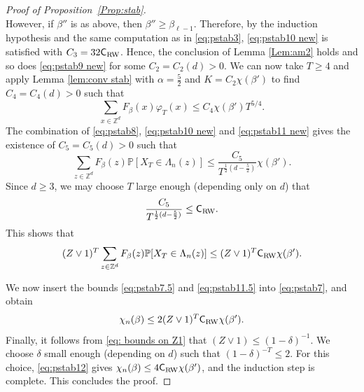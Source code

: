 \documentclass[11pt,a4paper]{article}
\numberwithin{equation}{section}
\theoremstyle{plain}
\theoremstyle{definition}
\newcommand\1{\mathds{1}}
\newcommand\Crw{\mathsf{C}_{\textup{RW}}}
\begin{document}
\begin{proof}[Proof of Proposition~\textup{\ref{Prop:stab}}]
\begin{equation}
\end{equation}
However, if $\beta''$ is as above, then $\beta''\geq \beta_{\ell-1}$. Therefore, by the induction hypothesis and the same computation as in \eqref{eq:pstab3}, \eqref{eq:pstab10 new} is satisfied with $C_3=32\Crw$. Hence, the conclusion of Lemma \ref{Lem:am2} holds and so does \eqref{eq:pstab9 new} for some $C_2=C_2(d)>0$. We can now take $T \geq 4$ and apply Lemma \ref{lem:conv stab} with $\alpha=\frac 52$ and $K=C_2\chi(\beta')$ to find $C_4=C_4(d)>0$ such that
\begin{equation}\label{eq:pstab11 new}
	\sum_{x\in \mathbb Z^d}F_\beta(x)\varphi_T(x)\leq C_4\chi(\beta')T^{5/4}.
\end{equation}
The combination of \eqref{eq:pstab8}, \eqref{eq:pstab10 new} and \eqref{eq:pstab11 new} gives the existence of $C_5=C_5(d)>0$ such that
\begin{equation}
\label{eq:pstab11.1}
	\sum_{z\in \mathbb Z^d}F_\beta(z)\mathbb P[X_T\in \Lambda_n(z)]
    \leq \frac{C_5}{T^{\frac 12 (d-\frac 52)}}\chi(\beta').
\end{equation}
Since $d \ge 3$,
we may choose $T$ large enough (depending only on $d$) that
\begin{equation}
	\frac{C_5}{T^{\frac 12 (d-\frac 52)}} \leq \Crw.
\end{equation}
This shows that
\begin{equation}
\label{eq:pstab11.5}
	(Z\vee 1)^T \sum_{z\in \mathbb Z^d}F_\beta(z)\mathbb P[X_T\in \Lambda_n(z)]
    \leq
    (Z\vee 1)^T \Crw\chi(\beta').
\end{equation}

We now insert the bounds \eqref{eq:pstab7.5} and \eqref{eq:pstab11.5}
into \eqref{eq:pstab7}, and obtain
\begin{equation}\label{eq:pstab12}
	\chi_n(\beta)\leq 2(Z\vee 1)^T\Crw\chi(\beta').
\end{equation}
Finally, it follows from \eqref{eq: bounds on Z1} that $(Z\vee 1)\leq (1-\delta)^{-1}$. We choose $\delta$
small enough (depending on $d$) such that $(1-\delta)^{-T}\leq 2$. For this choice, \eqref{eq:pstab12} gives $\chi_n(\beta)\leq 4\Crw\chi(\beta')$, and the induction step is complete.  This concludes the proof.
\end{proof}
\end{document}
